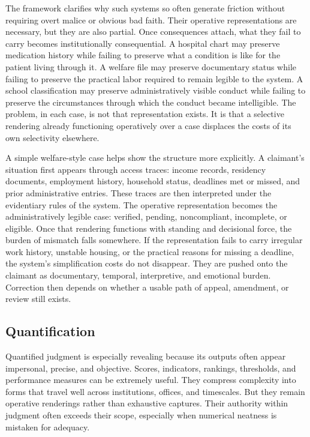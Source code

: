 \documentclass[11pt]{article}
\begin{document}
The framework clarifies why such systems so often generate friction without requiring overt malice or obvious bad faith. Their operative representations are necessary, but they are also partial. Once consequences attach, what they fail to carry becomes institutionally consequential. A hospital chart may preserve medication history while failing to preserve what a condition is like for the patient living through it. A welfare file may preserve documentary status while failing to preserve the practical labor required to remain legible to the system. A school classification may preserve administratively visible conduct while failing to preserve the circumstances through which the conduct became intelligible. The problem, in each case, is not that representation exists. It is that a selective rendering already functioning operatively over a case displaces the costs of its own selectivity elsewhere.\cite{BowkerStar1999SortingThingsOut,Fricker2007EpistemicInjustice,MoynihanHerdHarvey2015AdministrativeBurden}

A simple welfare-style case helps show the structure more explicitly. A claimant's situation first appears through access traces: income records, residency documents, employment history, household status, deadlines met or missed, and prior administrative entries. These traces are then interpreted under the evidentiary rules of the system. The operative representation becomes the administratively legible case: verified, pending, noncompliant, incomplete, or eligible. Once that rendering functions with standing and decisional force, the burden of mismatch falls somewhere. If the representation fails to carry irregular work history, unstable housing, or the practical reasons for missing a deadline, the system's simplification costs do not disappear. They are pushed onto the claimant as documentary, temporal, interpretive, and emotional burden. Correction then depends on whether a usable path of appeal, amendment, or review still exists.

\subsection{Quantification}

Quantified judgment is especially revealing because its outputs often appear impersonal, precise, and objective. Scores, indicators, rankings, thresholds, and performance measures can be extremely useful. They compress complexity into forms that travel well across institutions, offices, and timescales. But they remain operative renderings rather than exhaustive captures. Their authority within judgment often exceeds their scope, especially when numerical neatness is mistaken for adequacy.
\end{document}
